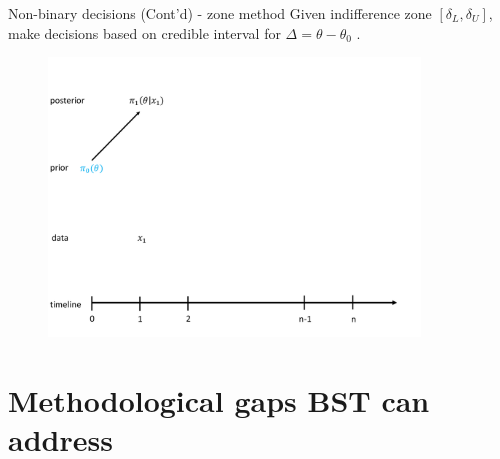 \documentclass[11pt
,fragile=singleslide
,xcolor=dvipsnames
]{beamer}
\begin{document}
\begin{frame}{Non-binary decisions (Cont'd) - zone method}
	Given \textcolor{Cerulean}{indifference zone} $[\delta_L, \delta_U]$,  make decisions based on credible interval for $\Delta = \theta - \theta_0$ \cite{berry2010bayesian}. 
	
	\begin{figure}
		\centering
		\includegraphics[width=0.88\textwidth, page=5, trim=0 1in 0 1in, clip]{figures/Bayesian_sequential_updating.pdf}
	\end{figure}
\end{frame}
	
	
\section{Methodological gaps BST can address}

\end{document}
